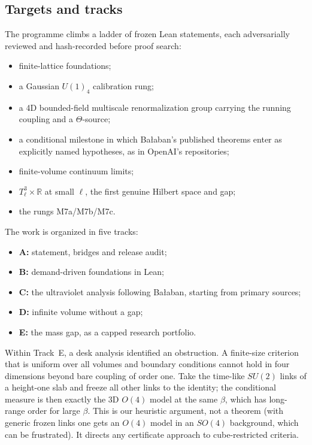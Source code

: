 \documentclass[11pt]{article}
\theoremstyle{definition}
\theoremstyle{remark}
\newcommand{\R}{\mathbb{R}}
\begin{document}
\subsection{Targets and tracks}
The programme climbs a ladder of frozen Lean statements, each adversarially reviewed and
hash-recorded before proof search:
\begin{itemize}[leftmargin=*]
\item finite-lattice foundations;
\item a Gaussian $U(1)_4$ calibration rung;
\item a 4D bounded-field multiscale renormalization group carrying the running coupling and a
  $\Theta$-source;
\item a conditional milestone in which Ba{\l}aban's published theorems enter as explicitly named
  hypotheses, as in OpenAI's repositories;
\item finite-volume continuum limits;
\item $T^3_\ell\times\R$ at small $\ell$, the first genuine Hilbert space and gap;
\item the rungs M7a/M7b/M7c.
\end{itemize}
The work is organized in five tracks:
\begin{itemize}[leftmargin=*]
\item \textbf{A:} statement, bridges and release audit;
\item \textbf{B:} demand-driven foundations in Lean;
\item \textbf{C:} the ultraviolet analysis following Ba{\l}aban, starting from primary sources;
\item \textbf{D:} infinite volume without a gap;
\item \textbf{E:} the mass gap, as a capped research portfolio.
\end{itemize}
Within Track~E, a desk analysis identified an obstruction. A finite-size criterion that is
uniform over all volumes and boundary conditions cannot hold in four dimensions beyond bare
coupling of order one. Take the time-like $SU(2)$ links of a height-one slab and freeze all other
links to the identity; the conditional measure is then exactly the 3D $O(4)$ model at the same
$\beta$, which has long-range order for large $\beta$. This is our heuristic argument, not a
theorem (with generic frozen links one gets an $O(4)$ model in an $SO(4)$ background, which can be
frustrated). It directs any certificate approach to cube-restricted criteria.
\end{document}
